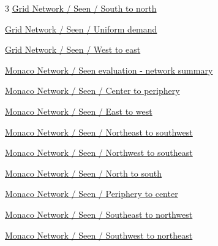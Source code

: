 \documentclass[11pt]{article}
\begin{document}
\begin{multicols}{3}
\noindent\hyperref[seen-grid-seen_S_to_N]{Grid Network / Seen / South to north}\hfill\pageref*{seen-grid-seen_S_to_N}\par\vspace{3pt}
\noindent\hyperref[seen-grid-seen_Uniform]{Grid Network / Seen / Uniform demand}\hfill\pageref*{seen-grid-seen_Uniform}\par\vspace{3pt}
\noindent\hyperref[seen-grid-seen_W_to_E]{Grid Network / Seen / West to east}\hfill\pageref*{seen-grid-seen_W_to_E}\par\vspace{3pt}
\noindent\hyperref[seen-monaco-summary]{Monaco Network / Seen evaluation - network summary}\hfill\pageref*{seen-monaco-summary}\par\vspace{3pt}
\noindent\hyperref[seen-monaco-seen_Center_to_Periphery]{Monaco Network / Seen / Center to periphery}\hfill\pageref*{seen-monaco-seen_Center_to_Periphery}\par\vspace{3pt}
\noindent\hyperref[seen-monaco-seen_E_to_W]{Monaco Network / Seen / East to west}\hfill\pageref*{seen-monaco-seen_E_to_W}\par\vspace{3pt}
\noindent\hyperref[seen-monaco-seen_NE_to_SW]{Monaco Network / Seen / Northeast to southwest}\hfill\pageref*{seen-monaco-seen_NE_to_SW}\par\vspace{3pt}
\noindent\hyperref[seen-monaco-seen_NW_to_SE]{Monaco Network / Seen / Northwest to southeast}\hfill\pageref*{seen-monaco-seen_NW_to_SE}\par\vspace{3pt}
\noindent\hyperref[seen-monaco-seen_N_to_S]{Monaco Network / Seen / North to south}\hfill\pageref*{seen-monaco-seen_N_to_S}\par\vspace{3pt}
\noindent\hyperref[seen-monaco-seen_Periphery_to_Center]{Monaco Network / Seen / Periphery to center}\hfill\pageref*{seen-monaco-seen_Periphery_to_Center}\par\vspace{3pt}
\noindent\hyperref[seen-monaco-seen_SE_to_NW]{Monaco Network / Seen / Southeast to northwest}\hfill\pageref*{seen-monaco-seen_SE_to_NW}\par\vspace{3pt}
\noindent\hyperref[seen-monaco-seen_SW_to_NE]{Monaco Network / Seen / Southwest to northeast}\hfill\pageref*{seen-monaco-seen_SW_to_NE}\par\vspace{3pt}

\end{multicols}
\end{document}
